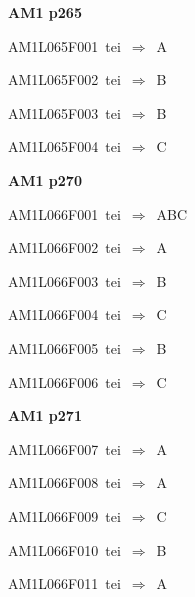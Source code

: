 \par\vfill\eject
{\bf\hfill AM1 p265\hfill\hbox{}}\par\bigskip
{\sixrm AM1L065F001\ {\sixit tei}\ }$\Rightarrow$\ A\par\smallskip
{\sixrm AM1L065F002\ {\sixit tei}\ }$\Rightarrow$\ B\par\smallskip
{\sixrm AM1L065F003\ {\sixit tei}\ }$\Rightarrow$\ B\par\smallskip
{\sixrm AM1L065F004\ {\sixit tei}\ }$\Rightarrow$\ C\par\smallskip

\par\vfill\eject
{\bf\hfill AM1 p270\hfill\hbox{}}\par\bigskip
{\sixrm AM1L066F001\ {\sixit tei}\ }$\Rightarrow$\ ABC\par\smallskip
{\sixrm AM1L066F002\ {\sixit tei}\ }$\Rightarrow$\ A\par\smallskip
{\sixrm AM1L066F003\ {\sixit tei}\ }$\Rightarrow$\ B\par\smallskip
{\sixrm AM1L066F004\ {\sixit tei}\ }$\Rightarrow$\ C\par\smallskip
{\sixrm AM1L066F005\ {\sixit tei}\ }$\Rightarrow$\ B\par\smallskip
{\sixrm AM1L066F006\ {\sixit tei}\ }$\Rightarrow$\ C\par\smallskip

\par\vfill\eject
{\bf\hfill AM1 p271\hfill\hbox{}}\par\bigskip
{\sixrm AM1L066F007\ {\sixit tei}\ }$\Rightarrow$\ A\par\smallskip
{\sixrm AM1L066F008\ {\sixit tei}\ }$\Rightarrow$\ A\par\smallskip
{\sixrm AM1L066F009\ {\sixit tei}\ }$\Rightarrow$\ C\par\smallskip
{\sixrm AM1L066F010\ {\sixit tei}\ }$\Rightarrow$\ B\par\smallskip
{\sixrm AM1L066F011\ {\sixit tei}\ }$\Rightarrow$\ A\par\smallskip

